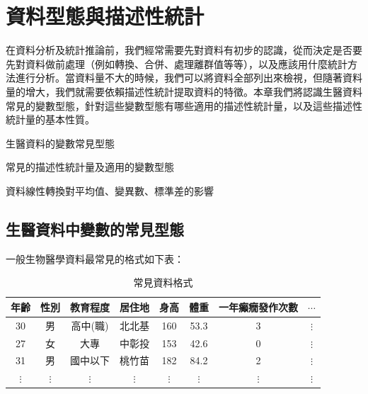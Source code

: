 \chapter{資料型態與描述性統計}
    在資料分析及統計推論前，我們經常需要先對資料有初步的認識，從而決定是否要先對資料做前處理（例如轉換、合併、處理離群值等等），以及應該用什麼統計方法進行分析。當資料量不大的時候，我們可以將資料全部列出來檢視，但隨著資料量的增大，我們就需要依賴描述性統計提取資料的特徵。本章我們將認識生醫資料常見的變數型態，針對這些變數型態有哪些適用的描述性統計量，以及這些描述性統計量的基本性質。
    
    \begin{introduction}[第 2 章學習目標]
        \item 生醫資料的變數常見型態
        \item 常見的描述性統計量及適用的變數型態
        \item 資料線性轉換對平均值、變異數、標準差的影響
    \end{introduction}

\section{生醫資料中變數的常見型態}

    一般生物醫學資料最常見的格式如下表：

    \begin{table}[htbp]
        \begin{center}
            \begin{tabular}{cccccccc}
                \toprule
                年齡 & 性別 & 教育程度 & 居住地 & 身高 & 體重 & 一年癲癇發作次數 & $\cdots$\\
                \hline
                30 & 男 & 高中(職) & 北北基 & 160 & 53.3 & 3 & $\vdots$ \\
                27 & 女 & 大專 & 中彰投 & 153 & 42.6 & 0 & $\vdots$ \\
                31 & 男 & 國中以下 & 桃竹苗 & 182 & 84.2 & 2 & $\vdots$ \\
                $\vdots$ & $\vdots$ & $\vdots$ & $\vdots$ & $\vdots$ & $\vdots$ & $\vdots$ & $\vdots$ \\
                \bottomrule
            \end{tabular}
            \caption{常見資料格式\label{tab:data}}
        \end{center}
    \end{table}
        
